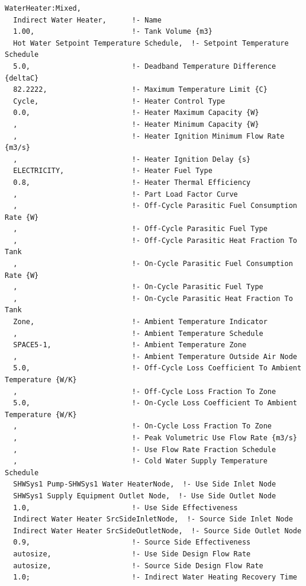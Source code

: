 \begin{lstlisting}
WaterHeater:Mixed,
  Indirect Water Heater,      !- Name
  1.00,                       !- Tank Volume {m3}
  Hot Water Setpoint Temperature Schedule,  !- Setpoint Temperature Schedule
  5.0,                        !- Deadband Temperature Difference {deltaC}
  82.2222,                    !- Maximum Temperature Limit {C}
  Cycle,                      !- Heater Control Type
  0.0,                        !- Heater Maximum Capacity {W}
  ,                           !- Heater Minimum Capacity {W}
  ,                           !- Heater Ignition Minimum Flow Rate {m3/s}
  ,                           !- Heater Ignition Delay {s}
  ELECTRICITY,                !- Heater Fuel Type
  0.8,                        !- Heater Thermal Efficiency
  ,                           !- Part Load Factor Curve
  ,                           !- Off-Cycle Parasitic Fuel Consumption Rate {W}
  ,                           !- Off-Cycle Parasitic Fuel Type
  ,                           !- Off-Cycle Parasitic Heat Fraction To Tank
  ,                           !- On-Cycle Parasitic Fuel Consumption Rate {W}
  ,                           !- On-Cycle Parasitic Fuel Type
  ,                           !- On-Cycle Parasitic Heat Fraction To Tank
  Zone,                       !- Ambient Temperature Indicator
  ,                           !- Ambient Temperature Schedule
  SPACE5-1,                   !- Ambient Temperature Zone
  ,                           !- Ambient Temperature Outside Air Node
  5.0,                        !- Off-Cycle Loss Coefficient To Ambient Temperature {W/K}
  ,                           !- Off-Cycle Loss Fraction To Zone
  5.0,                        !- On-Cycle Loss Coefficient To Ambient Temperature {W/K}
  ,                           !- On-Cycle Loss Fraction To Zone
  ,                           !- Peak Volumetric Use Flow Rate {m3/s}
  ,                           !- Use Flow Rate Fraction Schedule
  ,                           !- Cold Water Supply Temperature Schedule
  SHWSys1 Pump-SHWSys1 Water HeaterNode,  !- Use Side Inlet Node
  SHWSys1 Supply Equipment Outlet Node,  !- Use Side Outlet Node
  1.0,                        !- Use Side Effectiveness
  Indirect Water Heater SrcSideInletNode,  !- Source Side Inlet Node
  Indirect Water Heater SrcSideOutletNode,  !- Source Side Outlet Node
  0.9,                        !- Source Side Effectiveness
  autosize,                   !- Use Side Design Flow Rate
  autosize,                   !- Source Side Design Flow Rate
  1.0;                        !- Indirect Water Heating Recovery Time
\end{lstlisting}

